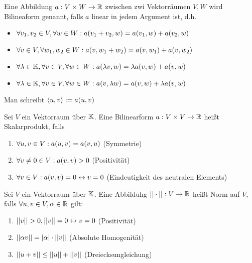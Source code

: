 \begin{definition}
	Eine Abbildung $a : V \times W \rightarrow \mathbb{R}$ zwischen zwi Vektorräumen $V,W$ wird Bilineaform genannt, falls $a$ linear in jedem Argument ist, d.h.
	\begin{itemize}[noitemsep]
		\item $\forall v_1, v_2 \in V, \forall w \in W: a(v_1 + v_2, w) = a(v_1,w) + a(v_2,w)$
		\item $\forall v \in V, \forall w_1, w_2 \in W: a(v, w_1 + w_2) = a(v,w_1) + a(v,w_2)$	
		\item $\forall \lambda \in \mathbb{K}, \forall v \in V, \forall w \in W: a(\lambda v, w) = \lambda a(v,w) + a(v,w)$	
		\item $\forall \lambda \in \mathbb{K}, \forall v \in V, \forall w \in W: a( v, \lambda w) = a(v,w) + \lambda a(v,w)$	
	\end{itemize}
	Man schreibt $\langle u, v \rangle := a(u,v)$
\end{definition}

\begin{definition}[Skalarpodukt]
	Sei $V$ ein Vektorraum über $\mathbb{K}$. Eine Bilinearform $a : V \times V \rightarrow \mathbb{R}$ heißt Skalarprodukt, falls
	\begin{enumerate}[noitemsep]
		\item $\forall u,v \in V : a(u,v) = a(v,u)$ (Symmetrie)
		\item $\forall v \neq 0 \in V : a(v,v) > 0$ (Positivität)
		\item $\forall v \in V : a(v,v) = 0 \leftrightarrow v = 0 $ (Eindeutigkeit des neutralen Elements)	
	\end{enumerate}
\end{definition}

\begin{definition}
	Sei $V$ ein Vektorraum über $\mathbb{K}$. Eine Abbilduhg $|| \cdot || : V \rightarrow \mathbb{R}$ heißt Norm auf $V$, falls $\forall u,v \in V, \alpha \in \mathbb{R}$ gilt:
	\begin{enumerate}[noitemsep]
		\item $||v|| > 0, ||v|| = 0 \leftrightarrow v = 0$ (Positivität)
		\item $||\alpha v|| = |\alpha| \cdot ||v||$ (Absolute Homogenität)
		\item $||u + v|| \leq ||u|| + ||v||$ (Dreiecksungleichung)
	\end{enumerate}
 \end{definition}

